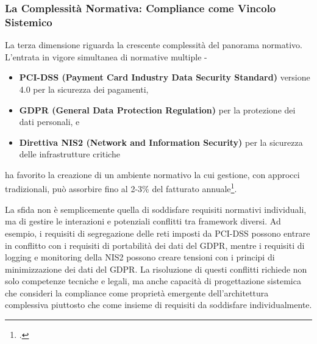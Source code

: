 
\subsubsection{La Complessità Normativa: Compliance come Vincolo Sistemico}

La terza dimensione riguarda la crescente complessità del panorama normativo. L'entrata in vigore simultanea di normative multiple - 
\begin{itemize}
    \item \textbf{PCI-DSS (Payment Card Industry Data Security Standard)} versione 4.0 per la sicurezza dei pagamenti,
    \item \textbf{GDPR (General Data Protection Regulation)} per la protezione dei dati personali, e
    \item \textbf{Direttiva NIS2 (Network and Information Security) }per la sicurezza delle infrastrutture critiche 
\end{itemize}
ha favorito la creazione di  un ambiente normativo la cui gestione, con approcci tradizionali, può assorbire fino al 2-3\% del fatturato annuale\footcite{ponemon2024compliance}.

La sfida non è semplicemente quella di soddisfare requisiti normativi individuali, ma di gestire le interazioni e potenziali conflitti tra framework diversi. 
Ad esempio, i requisiti di segregazione delle reti imposti da PCI-DSS possono entrare in conflitto con i requisiti di portabilità dei dati del GDPR, mentre i requisiti di logging e monitoring della NIS2 possono creare tensioni con i principi di minimizzazione dei dati del GDPR. 
La risoluzione di questi conflitti richiede non solo competenze tecniche e legali, ma anche capacità di progettazione sistemica che consideri la compliance come proprietà emergente dell'architettura complessiva piuttosto che come insieme di requisiti da soddisfare individualmente.

